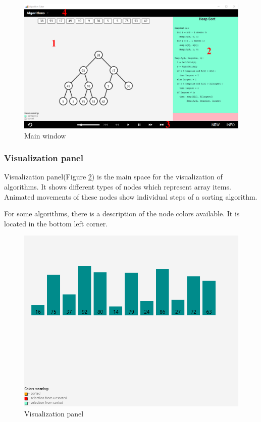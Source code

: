 \documentclass[
  field=inf,
  biblatex,
  language=english,
  glossaries,
  theorems=false,
  index
]{kidiplom}
\begin{document}
\begin{figure}[H]
\begin{center}
	
	\includegraphics[width=\textwidth]{img/UI.png}
	\caption{Main window}\label{fig:ui}
\end{center}
\end{figure}

\subsubsection{Visualization panel}
Visualization panel(Figure \ref{fig:vispanel}) is the main space for the visualization of algorithms. It shows different types of nodes which represent array items. Animated movements of these nodes show individual steps of a sorting algorithm. 

For some algorithms, there is a description of the node colors available. It is located in the bottom left corner.

\begin{figure}[H]
\begin{center}
	
	\includegraphics[scale=0.4]{img/ui/Vispanel.png}
	\caption{Visualization panel}\label{fig:vispanel}
\end{center}
\end{figure}
\end{document}
